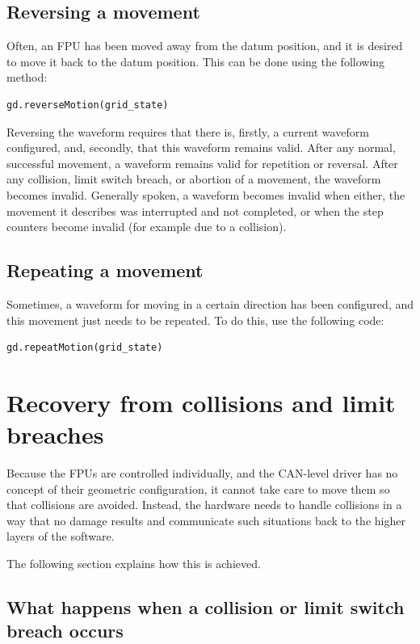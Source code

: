 \documentclass{scrartcl}[12pt,a4paper]
\begin{document}
\subsection{Reversing a movement}
Often, an FPU has been moved away from the datum position, and it is
desired to move it back to the datum position.  This can be done using
the following method:

\begin{verbatim}
gd.reverseMotion(grid_state)
\end{verbatim}

Reversing the waveform requires that there is, firstly, a current
waveform configured, and, secondly, that this waveform remains valid.
After any normal, successful movement, a waveform remains valid for
repetition or reversal. After any collision, limit switch breach, or
abortion of a movement, the waveform becomes invalid. Generally
spoken, a waveform becomes invalid when either, the movement it
describes was interrupted and not completed, or when the step counters
become invalid (for example due to a collision).


\subsection{Repeating a movement}

Sometimes, a waveform for moving in a certain direction has been
configured, and this movement just needs to be repeated.  To do this,
use the following code:

\begin{verbatim}
gd.repeatMotion(grid_state)
\end{verbatim}


\section{Recovery from collisions and limit breaches}
\label{sec:recovery}

Because the FPUs are controlled individually, and the CAN-level driver
has no concept of their geometric configuration, it cannot take care
to move them so that collisions are avoided.  Instead, the hardware
needs to handle collisions in a way that no damage results and
communicate such situations back to the higher layers of the software.

The following section explains how this is achieved.

\subsection{What happens when a collision or limit switch breach occurs}
\end{document}
